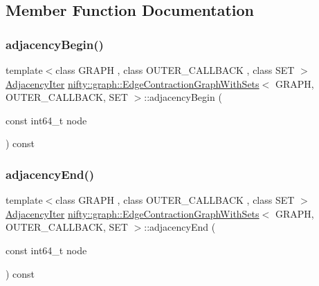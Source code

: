 \subsection{Member Function Documentation}
\mbox{\label{classnifty_1_1graph_1_1EdgeContractionGraphWithSets_afa35da06be055f5b3b5ca45140c2a27d}} 
\subsubsection{\texorpdfstring{adjacency\+Begin()}{adjacencyBegin()}}
{\footnotesize\ttfamily template$<$class G\+R\+A\+PH , class O\+U\+T\+E\+R\+\_\+\+C\+A\+L\+L\+B\+A\+CK , class S\+ET $>$ \\
\hyperlink{classnifty_1_1graph_1_1EdgeContractionGraphWithSets_ab4782e97223ab8ba2d207325aae693d6}{Adjacency\+Iter} \hyperlink{classnifty_1_1graph_1_1EdgeContractionGraphWithSets}{nifty\+::graph\+::\+Edge\+Contraction\+Graph\+With\+Sets}$<$ G\+R\+A\+PH, O\+U\+T\+E\+R\+\_\+\+C\+A\+L\+L\+B\+A\+CK, S\+ET $>$\+::adjacency\+Begin (\begin{DoxyParamCaption}\item[{const int64\+\_\+t}]{node }\end{DoxyParamCaption}) const\hspace{0.3cm}{\ttfamily [inline]}}

\mbox{\label{classnifty_1_1graph_1_1EdgeContractionGraphWithSets_a1d8876f14af17d956c0803d5703227af}} 
\subsubsection{\texorpdfstring{adjacency\+End()}{adjacencyEnd()}}
{\footnotesize\ttfamily template$<$class G\+R\+A\+PH , class O\+U\+T\+E\+R\+\_\+\+C\+A\+L\+L\+B\+A\+CK , class S\+ET $>$ \\
\hyperlink{classnifty_1_1graph_1_1EdgeContractionGraphWithSets_ab4782e97223ab8ba2d207325aae693d6}{Adjacency\+Iter} \hyperlink{classnifty_1_1graph_1_1EdgeContractionGraphWithSets}{nifty\+::graph\+::\+Edge\+Contraction\+Graph\+With\+Sets}$<$ G\+R\+A\+PH, O\+U\+T\+E\+R\+\_\+\+C\+A\+L\+L\+B\+A\+CK, S\+ET $>$\+::adjacency\+End (\begin{DoxyParamCaption}\item[{const int64\+\_\+t}]{node }\end{DoxyParamCaption}) const\hspace{0.3cm}{\ttfamily [inline]}}

